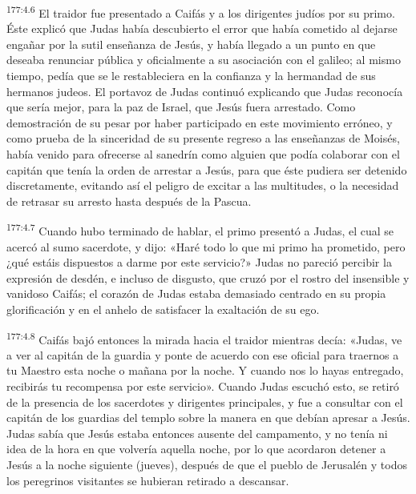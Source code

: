 \par 
\textsuperscript{177:4.6} El traidor fue presentado a Caifás y a los dirigentes judíos por su primo. Éste explicó que Judas había descubierto el error que había cometido al dejarse engañar por la sutil enseñanza de Jesús, y había llegado a un punto en que deseaba renunciar pública y oficialmente a su asociación con el galileo; al mismo tiempo, pedía que se le restableciera en la confianza y la hermandad de sus hermanos judeos. El portavoz de Judas continuó explicando que Judas reconocía que sería mejor, para la paz de Israel, que Jesús fuera arrestado. Como demostración de su pesar por haber participado en este movimiento erróneo, y como prueba de la sinceridad de su presente regreso a las enseñanzas de Moisés, había venido para ofrecerse al sanedrín como alguien que podía colaborar con el capitán que tenía la orden de arrestar a Jesús, para que éste pudiera ser detenido discretamente, evitando así el peligro de excitar a las multitudes, o la necesidad de retrasar su arresto hasta después de la Pascua.

\par 
\textsuperscript{177:4.7} Cuando hubo terminado de hablar, el primo presentó a Judas, el cual se acercó al sumo sacerdote, y dijo: «Haré todo lo que mi primo ha prometido, pero ¿qué estáis dispuestos a darme por este servicio?» Judas no pareció percibir la expresión de desdén, e incluso de disgusto, que cruzó por el rostro del insensible y vanidoso Caifás; el corazón de Judas estaba demasiado centrado en su propia glorificación y en el anhelo de satisfacer la exaltación de su ego.

\par 
\textsuperscript{177:4.8} Caifás bajó entonces la mirada hacia el traidor mientras decía: «Judas, ve a ver al capitán de la guardia y ponte de acuerdo con ese oficial para traernos a tu Maestro esta noche o mañana por la noche. Y cuando nos lo hayas entregado, recibirás tu recompensa por este servicio». Cuando Judas escuchó esto, se retiró de la presencia de los sacerdotes y dirigentes principales, y fue a consultar con el capitán de los guardias del templo sobre la manera en que debían apresar a Jesús. Judas sabía que Jesús estaba entonces ausente del campamento, y no tenía ni idea de la hora en que volvería aquella noche, por lo que acordaron detener a Jesús a la noche siguiente (jueves), después de que el pueblo de Jerusalén y todos los peregrinos visitantes se hubieran retirado a descansar.

